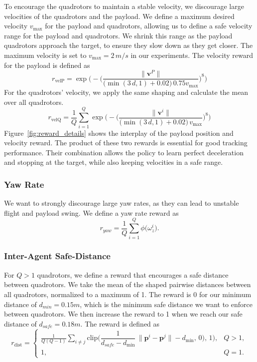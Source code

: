 To encourage the quadrotors to maintain a stable velocity, we discourage large velocities of the quadrotors and the payload. We define a maximum desired velocity $v_{\max}$ for the payload and quadrotors, allowing us to define a safe velocity range for the payload and quadrotors. We shrink this range as the payload quadrotors approach the target, to ensure they slow down as they get closer. The maximum velocity is set to $v_{\max}=2\,m/s$ in our experiments. The velocity reward for the payload is defined as
\begin{equation}
r_{\mathrm{velP}}
= \exp\!\Biggl(-\biggl(\frac{\lVert \mathbf{v}^P\rVert}{\bigl(\min(3\,d,1)+0.02\bigr)\,0.75v_{\max}}\biggr)^{8}\Biggr)
\end{equation}
For the quadrotors' velocity, we apply the same shaping and calculate the mean over all quadrotors.
\begin{equation}
r_{\mathrm{velQ}}
= \frac{1}{Q}\sum_{i=1}^Q \exp\!\Biggl(-\biggl(\frac{\lVert \mathbf{v}^i\rVert}{\bigl(\min(3\,d,1)+0.02\bigr)\,v_{\max}}\biggr)^{8}\Biggr) 
\end{equation}
Figure~\ref{fig:reward_details} shows the interplay of the payload position and velocity reward. The product of these two rewards is essential for good tracking performance. Their combination allows the policy to learn perfect deceleration and stopping at the target, while also keeping velocities in a safe range.
\subsubsection{Yaw Rate}
We want to strongly discourage large yaw rates, as they can lead to unstable flight and payload swing. We define a yaw rate reward as
\begin{equation}
r_{yaw}
= \frac{1}{Q}\sum_{i=1}^{Q}\phi\bigl(\omega_z^i\bigr).
\end{equation}
\subsubsection{Inter-Agent Safe-Distance}
For $Q>1$ quadrotors, we define a reward that encourages a safe distance between quadrotors. We take the mean of the shaped pairwise distances between all quadrotors, normalized to a maximum of 1. The reward is 0 for our minimum distance of $d_{min}= 0.15 m$, which is the minimum safe distance we want to enforce between quadrotors. We then increase the reward to 1 when we reach our safe distance of $d_{safe}=0.18 m$. The reward is defined as
\begin{equation}
r_{\mathrm{dist}} =
\begin{cases}
\displaystyle
\frac{1}{Q(Q-1)} \sum_{i \neq j}
\mathrm{clip}\bigl(\dfrac{1}{d_{safe}-d_{\min}}\,\|\mathbf{p}^i - \mathbf{p}^j\| - d_{\min},\,0),\,1\bigr),
& Q > 1,\\[1.5ex]
1, & Q = 1.
\end{cases}
\end{equation}


